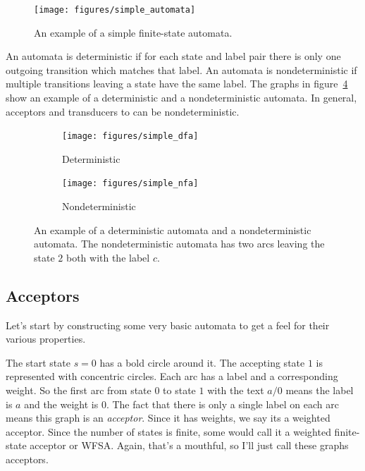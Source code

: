 \documentclass[main.tex]{subfiles}
\begin{document}
\begin{figure}
    \centering
    \texttt{[image: figures/simple\_automata]}
    \caption{An example of a simple finite-state automata.}
    \label{fig:simple_automata}
 \end{figure}

An automata is deterministic if for each state and label pair there is only one
outgoing transition which matches that label. An automata is nondeterministic
if multiple transitions leaving a state have the same label. The graphs in
figure~\ref{fig:dfa_nfa} show an example of a deterministic and a
nondeterministic automata. In general, acceptors and transducers to can be
nondeterministic.

\begin{figure}
    \centering
    \begin{subfigure}[b]{0.48\textwidth}
        \texttt{[image: figures/simple\_dfa]}
        \caption{Deterministic}
        \label{fig:simple_dfa}
    \end{subfigure}
    \begin{subfigure}[b]{0.48\textwidth}
        \texttt{[image: figures/simple\_nfa]}
        \caption{Nondeterministic}
        \label{fig:simple_nfa}
    \end{subfigure}
    \caption{An example of a deterministic automata and a
    nondeterministic automata. The nondeterministic automata has
    two arcs leaving the state $2$ both with the label $c$.}
    \label{fig:dfa_nfa}
\end{figure}

\subsection{Acceptors}

Let's start by constructing some very basic automata to get a feel for their
various properties.

The start state $s = 0$ has a bold circle around it. The accepting state $1$ is
represented with concentric circles. Each arc has a label and a corresponding
weight. So the first arc from state $0$ to state $1$ with the text $a/0$ means
the label is $a$ and the weight is $0$. The fact that there is only a single
label on each arc means this graph is an \emph{acceptor}. Since it has weights,
we say its a weighted acceptor. Since the number of states is finite, some
would call it a weighted finite-state acceptor or WFSA. Again, that's a
mouthful, so I'll just call these graphs acceptors.
\end{document}
